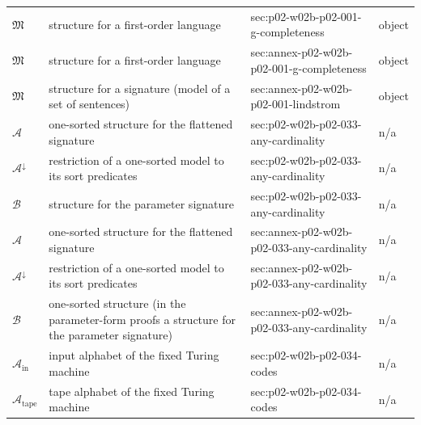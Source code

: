 \begin{longtable}{@{}p{}p{}p{}p{}@{}}
\(\mathfrak M\) & structure for a first-order language & sec:\allowbreak{}p02-\allowbreak{}w02b-\allowbreak{}p02-\allowbreak{}001-\allowbreak{}g-\allowbreak{}completeness & object \\
\(\mathfrak M\) & structure for a first-order language & sec:\allowbreak{}annex-\allowbreak{}p02-\allowbreak{}w02b-\allowbreak{}p02-\allowbreak{}001-\allowbreak{}g-\allowbreak{}completeness & object \\
\(\mathfrak M\) & structure for a signature (model of a set of sentences) & sec:\allowbreak{}annex-\allowbreak{}p02-\allowbreak{}w02b-\allowbreak{}p02-\allowbreak{}001-\allowbreak{}lindstrom & object \\
\(\mathcal A\) & one-sorted structure for the flattened signature & sec:\allowbreak{}p02-\allowbreak{}w02b-\allowbreak{}p02-\allowbreak{}033-\allowbreak{}any-\allowbreak{}cardinality & n/a \\
\(\mathcal A^{\downarrow}\) & restriction of a one-sorted model to its sort predicates & sec:\allowbreak{}p02-\allowbreak{}w02b-\allowbreak{}p02-\allowbreak{}033-\allowbreak{}any-\allowbreak{}cardinality & n/a \\
\(\mathcal B\) & structure for the parameter signature & sec:\allowbreak{}p02-\allowbreak{}w02b-\allowbreak{}p02-\allowbreak{}033-\allowbreak{}any-\allowbreak{}cardinality & n/a \\
\(\mathcal A\) & one-sorted structure for the flattened signature & sec:\allowbreak{}annex-\allowbreak{}p02-\allowbreak{}w02b-\allowbreak{}p02-\allowbreak{}033-\allowbreak{}any-\allowbreak{}cardinality & n/a \\
\(\mathcal A^{\downarrow}\) & restriction of a one-sorted model to its sort predicates & sec:\allowbreak{}annex-\allowbreak{}p02-\allowbreak{}w02b-\allowbreak{}p02-\allowbreak{}033-\allowbreak{}any-\allowbreak{}cardinality & n/a \\
\(\mathcal B\) & one-sorted structure (in the parameter-form proofs a structure for the parameter signature) & sec:\allowbreak{}annex-\allowbreak{}p02-\allowbreak{}w02b-\allowbreak{}p02-\allowbreak{}033-\allowbreak{}any-\allowbreak{}cardinality & n/a \\
\(\mathcal A_{\mathrm{in}}\) & input alphabet of the fixed Turing machine & sec:\allowbreak{}p02-\allowbreak{}w02b-\allowbreak{}p02-\allowbreak{}034-\allowbreak{}codes & n/a \\
\(\mathcal A_{\mathrm{tape}}\) & tape alphabet of the fixed Turing machine & sec:\allowbreak{}p02-\allowbreak{}w02b-\allowbreak{}p02-\allowbreak{}034-\allowbreak{}codes & n/a \\

\end{longtable}
